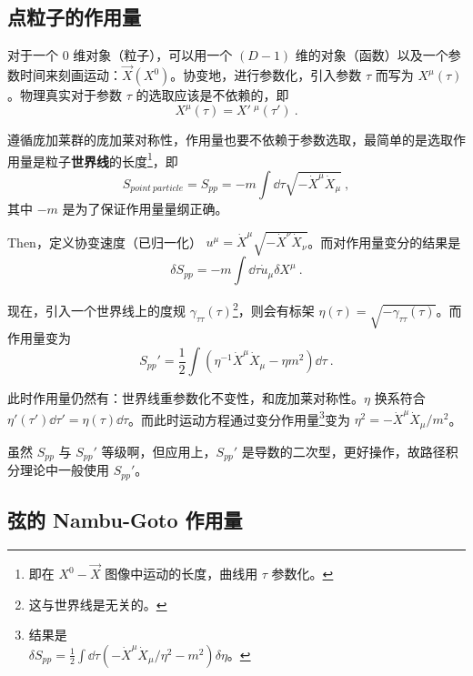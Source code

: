 

\subsection{点粒子的作用量}
对于一个 $0$ 维对象（粒子），可以用一个 $(D-1)$ 维的对象（函数）以及一个参数时间来刻画运动：$\vec X(X^0)$。协变地，进行参数化，引入参数 $\tau$ 而写为 $X^\mu(\tau)$。物理真实对于参数 $\tau$ 的选取应该是不依赖的，即
\begin{equation}
	X^\mu(\tau) = X'~^\mu(\tau') ~.
\end{equation}

遵循庞加莱群的庞加莱对称性，作用量也要不依赖于参数选取，最简单的是选取作用量是粒子\textbf{世界线}的长度\footnote{即在 $X^0-\vec X$ 图像中运动的长度，曲线用 $\tau$ 参数化。}，即 
\begin{equation}
	S_{point ~particle} = S_{pp} = -m \int \dd \tau \sqrt{- \dot X^\mu \dot X_\mu} ~,
\end{equation}
其中 $-m$ 是为了保证作用量量纲正确。

Then，定义协变速度（已归一化） $u^\mu = \dot X^\mu \sqrt{-\dot X^\nu \dot X_\nu}$。而对作用量变分的结果是 
\begin{equation}
	\delta S_{pp} = -m \int \dd \tau \dot u_{\mu} \delta X^\mu ~.
\end{equation}

现在，引入一个世界线上的度规 $\gamma_{\tau \tau}(\tau)$\footnote{这与世界线是无关的。}，则会有标架 $\eta(\tau) = \sqrt{- \gamma_{\tau \tau}(\tau)}$。而作用量变为
\begin{equation}
	S_{pp}' = \frac{1}{2} \int (\eta^{-1} \dot X^\mu \dot X_\mu - \eta m^2) \dd \tau ~.
\end{equation}

此时作用量仍然有：世界线重参数化不变性，和庞加莱对称性。$\eta$ 换系符合 $\eta'(\tau') \dd \tau' = \eta(\tau) \dd \tau$。而此时运动方程通过变分作用量\footnote{结果是 \\ $\delta S_{pp} = \frac{1}{2} \int \dd \tau (- \dot X^\mu \dot X_\mu/\eta^2 - m^2) \delta \eta$。}变为 $\eta^2 = -\dot X^\mu \dot X_\mu / m^2$。

虽然 $S_{pp}$ 与 $S_{pp}'$ 等级啊，但应用上，$S_{pp}'$ 是导数的二次型，更好操作，故路径积分理论中一般使用 $S_{pp}'$。

\subsection{弦的 Nambu-Goto 作用量}

